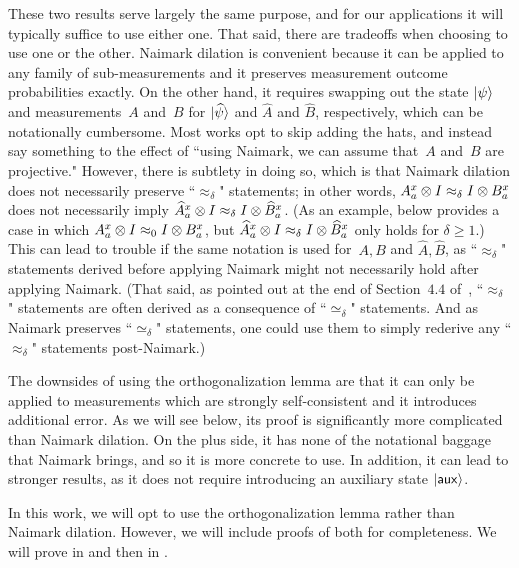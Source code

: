 These two results serve largely the same purpose,
and for our applications it will typically suffice to use either one.
That said, there are tradeoffs when choosing to use one or the other.
Naimark dilation is convenient because it can be applied to any family of sub-measurements
and it preserves measurement outcome probabilities exactly.
On the other hand, it requires swapping out the state $\ket{\psi}$ and measurements~$A$ and~$B$
for $\ket{\widehat{\psi}}$ and $\widehat{A}$ and $\widehat{B}$, respectively,
which can be notationally cumbersome.
Most works opt to skip adding the hats,
and instead say something to the effect of ``using Naimark, we can assume that~$A$ and~$B$ are projective."
However, there is subtlety in doing so,
which is that Naimark dilation does not necessarily preserve ``$\approx_{\delta}$" statements;
in other words, $A^x_a \otimes I \approx_{\delta} I \otimes B^x_a$
does not necessarily imply $\widehat{A}^x_a \otimes I \approx_{\delta} I \otimes \widehat{B}^x_a$.
(As an example,  below
provides a case in which $A^x_a \otimes I \approx_{0} I \otimes B^x_a$,
but $\widehat{A}^x_a \otimes I \approx_{\delta} I \otimes \widehat{B}^x_a$ only holds for $\delta \geq 1$.)
This can lead to trouble if the same notation is used for~$A, B$ and $\widehat{A}, \widehat{B}$,
as ``$\approx_{\delta}$" statements derived before applying Naimark might not necessarily hold after applying Naimark.
(That said, as pointed out at the end of Section~$4.4$ of~\cite{NW19},
``$\approx_{\delta}$" statements are often derived as a consequence of ``$\simeq_{\delta}$" statements.
And as Naimark preserves ``$\simeq_{\delta}$" statements,
one could use them to simply rederive any ``$\approx_{\delta}$" statements post-Naimark.)

The downsides of using the orthogonalization lemma
are that it can only be applied to measurements which are strongly self-consistent
and it introduces additional error.
As we will see below, its proof is significantly more complicated than Naimark dilation.
On the plus side, it has none of the notational baggage that Naimark brings,
and so it is more concrete to use.
In addition, it can lead to stronger results,
as it does not require introducing an auxiliary state $\ket{\mathsf{aux}}$.

In this work, we will opt to use the orthogonalization lemma rather than Naimark dilation.
However, we will include proofs of both for completeness.
We will prove  in 
and then  in .

